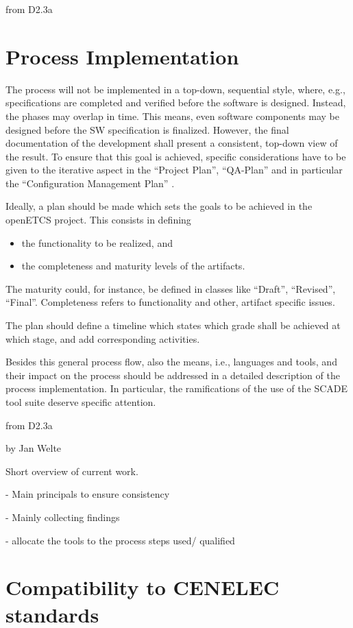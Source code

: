 \documentclass{template/openetcs_report}
\begin{document}
from D2.3a

\section{Process Implementation}
\label{sec:proc-impl}

The process will not be implemented in a top-down, sequential style,
where, e.g., specifications are completed and verified before the
software is designed. Instead, the phases may overlap in time. This
means, even software components may be designed before the SW
specification is finalized. However, the final documentation of the
development shall present a consistent, top-down view of the
result. To ensure that this goal is achieved, specific considerations
have to be given to the iterative aspect in the ``Project Plan'',
``QA-Plan'' and in particular the ``Configuration Management Plan'' .


Ideally, a plan should be made which sets the goals to be achieved
in the openETCS project. This consists in defining  
\begin{itemize}
\item the functionality to be realized, and
\item the completeness and maturity levels of the artifacts. 
\end{itemize}
The maturity could, for instance, be defined in classes like
``Draft'', ``Revised'', ``Final''. Completeness refers to
functionality and other, artifact specific issues. 

The plan should define a timeline which states which grade shall be
achieved at which stage, and add corresponding activities.

Besides this general process flow, also the means, i.e., languages and
tools, and their impact on the process should be addressed in a
detailed description of the process implementation. In particular, the
ramifications of the use of the SCADE tool suite deserve specific attention.

from D2.3a

by Jan Welte

Short overview of current work.

- Main principals to ensure consistency 

- Mainly collecting findings

- allocate the tools to the process steps used/ qualified

\section{Compatibility to CENELEC standards}
\end{document}
